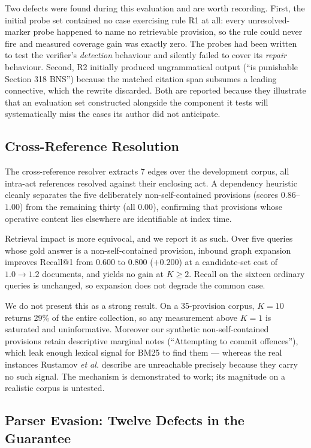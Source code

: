 \documentclass[conference]{IEEEtran}
\begin{document}
Two defects were found during this evaluation and are worth recording. First,
the initial probe set contained no case exercising rule R1 at all: every
unresolved-marker probe happened to name no retrievable provision, so the rule
could never fire and measured coverage gain was exactly zero. The probes had
been written to test the verifier's \emph{detection} behaviour and silently
failed to cover its \emph{repair} behaviour. Second, R2 initially produced
ungrammatical output (``is punishable Section 318 BNS'') because the matched
citation span subsumes a leading connective, which the rewrite discarded. Both
are reported because they illustrate that an evaluation set constructed
alongside the component it tests will systematically miss the cases its author
did not anticipate.

\subsection{Cross-Reference Resolution}
\label{ssec:xref}

The cross-reference resolver extracts 7 edges over the development corpus, all
intra-act references resolved against their enclosing act. A dependency
heuristic cleanly separates the five deliberately non-self-contained provisions
(scores $0.86$--$1.00$) from the remaining thirty (all $0.00$), confirming that
provisions whose operative content lies elsewhere are identifiable at index
time.

Retrieval impact is more equivocal, and we report it as such. Over five queries
whose gold answer is a non-self-contained provision, inbound graph expansion
improves Recall@1 from $0.600$ to $0.800$ ($+0.200$) at a candidate-set cost of
$1.0 \rightarrow 1.2$ documents, and yields no gain at $K \geq 2$. Recall on
the sixteen ordinary queries is unchanged, so expansion does not degrade the
common case.

We do not present this as a strong result. On a 35-provision corpus, $K=10$
returns 29\% of the entire collection, so any measurement above $K=1$ is
saturated and uninformative. Moreover our synthetic non-self-contained
provisions retain descriptive marginal notes (``Attempting to commit
offences''), which leak enough lexical signal for BM25 to find them --- whereas
the real instances Rustamov \textit{et al.} describe are unreachable precisely
because they carry no such signal. The mechanism is demonstrated to work; its
magnitude on a realistic corpus is untested.

\subsection{Parser Evasion: Twelve Defects in the Guarantee}
\label{ssec:evasion}
\end{document}
